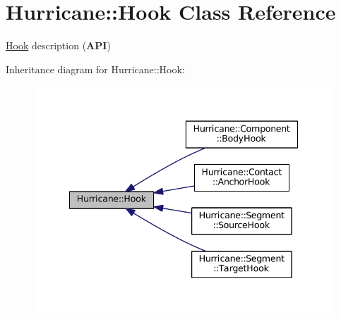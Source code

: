 \hypertarget{classHurricane_1_1Hook}{}\section{Hurricane\+:\+:Hook Class Reference}
\label{classHurricane_1_1Hook}


\mbox{\hyperlink{classHurricane_1_1Hook}{Hook}} description ({\bfseries A\+PI})  




Inheritance diagram for Hurricane\+:\+:Hook\+:\nopagebreak
\begin{figure}[H]
\begin{center}
\leavevmode
\includegraphics[width=338pt]{classHurricane_1_1Hook__inherit__graph}
\end{center}
\end{figure}
